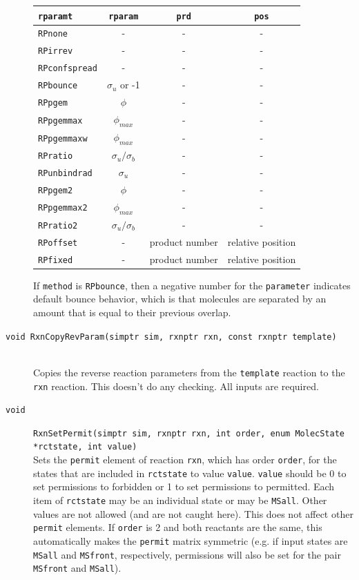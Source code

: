 \documentclass {scrbook}
\newcommand {\ttt} {\texttt}
\begin{document}
\begin{description}
\begin{longtable}[c]{lccc}
\ttt{rparamt} & \ttt{rparam} & \ttt{prd} & \ttt{pos}\\
\hline
\ttt{RPnone} & - & - & -\\
\ttt{RPirrev} & - & - & -\\
\ttt{RPconfspread} & - & - & -\\
\ttt{RPbounce} & $\sigma_u$ or -1 & - & -\\
\ttt{RPpgem} & $\phi$ & - & -\\
\ttt{RPpgemmax} & $\phi_{max}$ & - & -\\
\ttt{RPpgemmaxw} & $\phi_{max}$ & - & -\\
\ttt{RPratio} & $\sigma_u/\sigma_b$ & - & -\\
\ttt{RPunbindrad} & $\sigma_u$ & - & -\\
\ttt{RPpgem2} & $\phi$ & - & -\\
\ttt{RPpgemmax2} & $\phi_{max}$ & - & -\\
\ttt{RPratio2} & $\sigma_u/\sigma_b$ & - & -\\
\ttt{RPoffset} & - & product number & relative position\\
\ttt{RPfixed} & - & product number & relative position\\
\end{longtable}

If \ttt{method} is \ttt{RPbounce}, then a negative number for the \ttt{parameter} indicates default bounce behavior, which is that molecules are separated by an amount that is equal to their previous overlap.

\item[\ttt{void RxnCopyRevParam(simptr sim, rxnptr rxn, const rxnptr template)}]
\hfill \\
Copies the reverse reaction parameters from the \ttt{template} reaction to the \ttt{rxn} reaction. This doesn't do any checking. All inputs are required.

\item[\ttt{void}]
\ttt{RxnSetPermit(simptr sim, rxnptr rxn, int order, enum MolecState *rctstate, int value)} \\
Sets the \ttt{permit} element of reaction \ttt{rxn}, which has order \ttt{order}, for the states that are included in \ttt{rctstate} to value \ttt{value}. \ttt{value} should be 0 to set permissions to forbidden or 1 to set permissions to permitted. Each item of \ttt{rctstate} may be an individual state or may be \ttt{MSall}. Other values are not allowed (and are not caught here). This does not affect other \ttt{permit} elements. If \ttt{order} is 2 and both reactants are the same, this automatically makes the \ttt{permit} matrix symmetric (e.g. if input states are \ttt{MSall} and \ttt{MSfront}, respectively, permissions will also be set for the pair \ttt{MSfront} and \ttt{MSall}).


\end{description}
\end{document}
